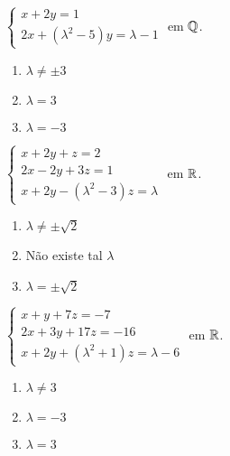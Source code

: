 \documentclass[12pt]{exam}
\begin{document}
\begin{exercicio}
    $
        \begin{cases}
            x + 2y = 1\\
            2x + (\lambda^2 - 5)y = \lambda - 1
        \end{cases}
    $
    em $\mathbb{Q}$.
    \begin{solucao}
        \begin{enumerate}[label={\alph*})]
            \item $\lambda \ne \pm 3$

            \item $\lambda = 3$

            \item $\lambda = -3$
        \end{enumerate}
    \end{solucao}
\end{exercicio}

\begin{exercicio}
    $
        \begin{cases}
            x + 2y + z = 2\\
            2x - 2y + 3z = 1\\
            x + 2y - (\lambda^2 - 3)z = \lambda
        \end{cases}
    $
    em $\mathbb{R}$.
    \begin{solucao}
        \begin{enumerate}[label={\alph*})]
            \item $\lambda \ne \pm \sqrt{2}$

            \item Não existe tal $\lambda$

            \item $\lambda = \pm \sqrt{2}$
        \end{enumerate}
    \end{solucao}
\end{exercicio}

\begin{exercicio}
    $
        \begin{cases}
            x + y + 7z = -7\\
            2x + 3y + 17z = -16\\
            x + 2y + (\lambda^2 + 1)z = \lambda - 6
        \end{cases}
    $
    em $\mathbb{R}$.
    \begin{solucao}
        \begin{enumerate}[label={\alph*})]
            \item $\lambda \ne 3$

            \item $\lambda = -3$

            \item $\lambda = 3$
        \end{enumerate}
    \end{solucao}
\end{exercicio}
\end{document}
